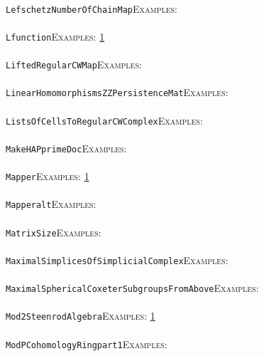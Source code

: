 \documentclass[a4paper,11pt]{report}
\begin{document}
{{ \\
 \texttt{LefschetzNumberOfChainMap}{\nobreakspace}{\nobreakspace}{\nobreakspace}{\nobreakspace}\textsc{Examples:} \\
 \\
 \texttt{Lfunction}{\nobreakspace}{\nobreakspace}{\nobreakspace}{\nobreakspace}\textsc{Examples:} \href{tutorial/chap10.html} {1}{\nobreakspace} \\
 \\
 \texttt{LiftedRegularCWMap}{\nobreakspace}{\nobreakspace}{\nobreakspace}{\nobreakspace}\textsc{Examples:} \\
 \\
 \texttt{LinearHomomorphismsZZPersistenceMat}{\nobreakspace}{\nobreakspace}{\nobreakspace}{\nobreakspace}\textsc{Examples:} \\
 \\
 \texttt{ListsOfCellsToRegularCWComplex}{\nobreakspace}{\nobreakspace}{\nobreakspace}{\nobreakspace}\textsc{Examples:} \\
 \\
 \texttt{MakeHAPprimeDoc}{\nobreakspace}{\nobreakspace}{\nobreakspace}{\nobreakspace}\textsc{Examples:} \\
 \\
 \texttt{Mapper}{\nobreakspace}{\nobreakspace}{\nobreakspace}{\nobreakspace}\textsc{Examples:} \href{tutorial/chap4.html} {1}{\nobreakspace} \\
 \\
 \texttt{Mapper{\textunderscore}alt}{\nobreakspace}{\nobreakspace}{\nobreakspace}{\nobreakspace}\textsc{Examples:} \\
 \\
 \texttt{MatrixSize}{\nobreakspace}{\nobreakspace}{\nobreakspace}{\nobreakspace}\textsc{Examples:} \\
 \\
 \texttt{MaximalSimplicesOfSimplicialComplex}{\nobreakspace}{\nobreakspace}{\nobreakspace}{\nobreakspace}\textsc{Examples:} \\
 \\
 \texttt{MaximalSphericalCoxeterSubgroupsFromAbove}{\nobreakspace}{\nobreakspace}{\nobreakspace}{\nobreakspace}\textsc{Examples:} \\
 \\
 \texttt{Mod2SteenrodAlgebra}{\nobreakspace}{\nobreakspace}{\nobreakspace}{\nobreakspace}\textsc{Examples:} \href{../www/SideLinks/About/aboutModPRings.html} {1}{\nobreakspace} \\
 \\
 \texttt{ModPCohomologyRing{\textunderscore}part{\textunderscore}1}{\nobreakspace}{\nobreakspace}{\nobreakspace}{\nobreakspace}\textsc{Examples:} \\
}}
\end{document}
